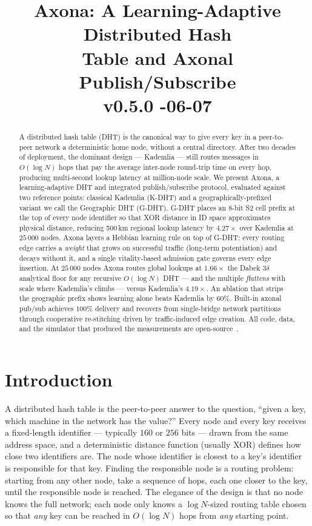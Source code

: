 \documentclass[conference]{IEEEtran}
\title{Axona: A Learning-Adaptive Distributed Hash\\Table and Axonal Publish/Subscribe\\[0.3em]{\normalsize\normalfont v0.5.0 \quad 2026-06-07}}
\author{
\IEEEauthorblockN{David A. Smith}
\IEEEauthorblockA{Axona.net\\
\texttt{davidasmith@gmail.com}}
}
\newcommand{\axona}{Axona\xspace}
\newcommand{\KDHT}{K-DHT\xspace}
\newcommand{\GDHT}{G-DHT\xspace}
\begin{document}
\maketitle
\pagestyle{plain}
\thispagestyle{plain}

\begin{abstract}
A distributed hash table (DHT) is the canonical way to give every key
in a peer-to-peer network a deterministic home node, without a
central directory.  After two decades of deployment, the dominant
design --- Kademlia --- still routes messages in $O(\log N)$ hops
that pay the average inter-node round-trip time on every hop,
producing multi-second lookup latency at million-node scale.  We
present \axona, a learning-adaptive DHT and integrated
publish/subscribe protocol, evaluated against two reference points:
classical Kademlia (\KDHT) and a geographically-prefixed variant we
call the Geographic DHT (\GDHT).  \GDHT places an 8-bit S2 cell
prefix at the top of every node identifier so that XOR distance in
ID space approximates physical distance, reducing 500\,km regional
lookup latency by $4.27\times$ over Kademlia at $25\,000$ nodes.
\axona layers a Hebbian learning rule on top of \GDHT: every routing
edge carries a \emph{weight} that grows on successful traffic
(long-term potentiation) and decays without it, and a single
vitality-based admission gate governs every edge insertion.  At
$25\,000$ nodes \axona routes global lookups at $1.66\times$ the
Dabek $3\delta$ analytical floor for any recursive $O(\log N)$ DHT
--- and the multiple \emph{flattens} with scale where Kademlia's
climbs --- versus
Kademlia's $4.19\times$.  An ablation that strips the geographic
prefix shows learning alone beats Kademlia by $60\%$.  Built-in
axonal pub/sub achieves $100\%$ delivery and recovers from
single-bridge network partitions through cooperative re-stitching
driven by traffic-induced edge creation.  All code, data, and the
simulator that produced the measurements are
open-source~\cite{dhtsim2026}.
\end{abstract}

\section{Introduction}
\label{sec:intro}

A distributed hash table is the peer-to-peer answer to the
question, ``given a key, which machine in the network has the
value?''  Every node and every key receives a fixed-length
identifier --- typically $160$ or $256$ bits --- drawn from the
same address space, and a deterministic distance function
(usually XOR) defines how close two identifiers are.  The node
whose identifier is closest to a key's identifier is responsible
for that key.  Finding the responsible node is a routing problem:
starting from any other node, take a sequence of hops, each one
closer to the key, until the responsible node is reached.  The
elegance of the design is that no node knows the full network;
each node only knows a $\log N$-sized routing table chosen so that
\emph{any} key can be reached in $O(\log N)$ hops from \emph{any}
starting point.
\end{document}
